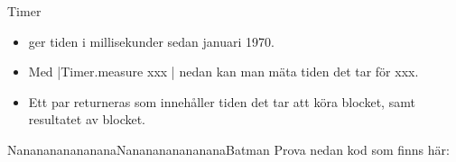 \begin{Slide}{Timer}\SlideFontSmall
\setlength{\leftmargini}{0pt}
\begin{itemize}
\item \href{https://docs.oracle.com/javase/8/docs/api/java/lang/System.html#currentTimeMillis--}{} ger tiden i millisekunder sedan januari 1970.

\item Med \code|Timer.measure{ xxx }| nedan kan man mäta tiden det tar för xxx.

\item Ett par  returneras som innehåller tiden det tar att köra blocket, samt resultatet av blocket.
\end{itemize}
\vspace{0em}
\end{Slide}


\begin{Slide}{NanananananananaNanananananananaBatman}
Prova nedan kod som finns här:\\
\href{}{}
\vspace{0em}
\end{Slide}

\fi







